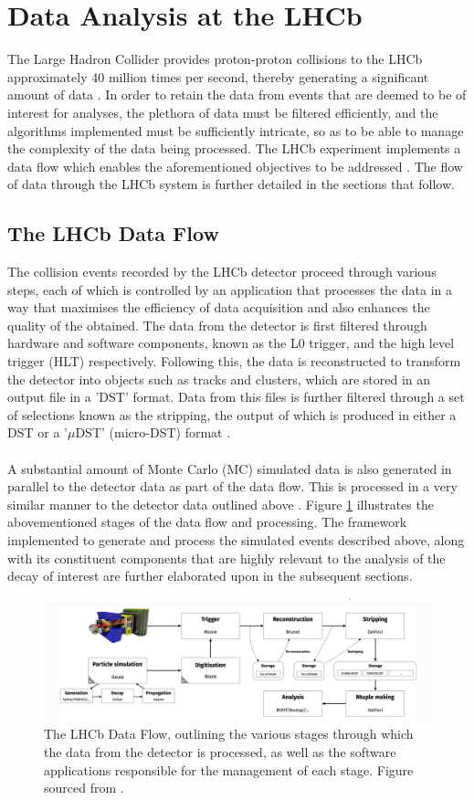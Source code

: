 \section{Data Analysis at the LHCb}
The Large Hadron Collider provides proton-proton collisions to the LHCb approximately 40 million times per second, thereby generating a significant amount of data \cite{LHCbSK}. In order to retain the data from events that are deemed to be of interest for analyses, the plethora of data must be filtered efficiently, and the algorithms
implemented must be sufficiently intricate, so as to be able to manage the complexity of the data being processed. The LHCb experiment implements a data flow which enables the aforementioned objectives to be addressed \cite{LHCbSK}. The flow of data through the LHCb system is further detailed in the sections that follow.
\subsection{The LHCb Data Flow}\label{LHCbDataFlow}
The collision events recorded by the LHCb detector proceed through various steps, each of which is controlled by an application that processes the data in a way that maximises the efficiency of data acquisition and also enhances the quality of the obtained. The data from the detector is first filtered through hardware and software components, known as the L0 trigger, and the high level trigger (HLT) respectively. Following this, the data is
reconstructed to transform the detector into objects such as tracks and clusters, which are stored in an output file in a 'DST' format. Data from this files is further filtered through a set of selections known as the stripping, the output of which is produced in either a DST or a '$\mu$DST' (micro-DST) format \cite{LHCbSK}.\\
\\
A substantial amount of Monte Carlo (MC) simulated data is also generated in parallel to the detector data as part of the data flow. This is processed in a very similar manner to the detector data outlined above \cite{LHCbSK}. Figure \ref{LHCbData} illustrates the abovementioned stages of the data flow and processing. The framework implemented to generate and process the simulated events described above, along with its constituent components that are highly relevant to the analysis of the decay of interest are further elaborated upon in the subsequent sections.
\begin{figure}[H]
    \centering
    \includegraphics[scale = 0.4]{LHCbDataFlow.jpg}
    \caption{The LHCb Data Flow, outlining the various stages through which the data from the detector is processed, as well as the software applications responsible for the management of each stage. Figure sourced from \cite{LHCbSK}.}
    \label{LHCbData}
\end{figure}
